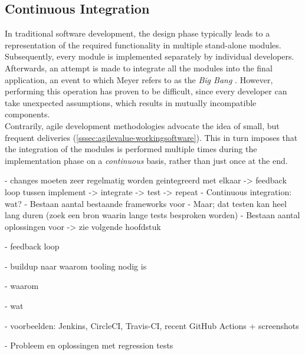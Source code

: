 
\subsection{Continuous Integration}
In traditional software development, the design phase typically leads to a representation of the required functionality in multiple stand-alone modules. Subsequently, every module is implemented separately by individual developers. Afterwards, an attempt is made to integrate all the modules into the final application, an event to which Meyer refers to as the \emph{Big Bang} \cite[~p.103]{Meyer2014}. However, performing this operation has proven to be difficult, since every developer can take unexpected assumptions, which results in mutually incompatible components.\\

\noindent Contrarily, agile development methodologies advocate the idea of small, but frequent deliveries (\autoref{sssec:agilevalue-workingsoftware}). This in turn imposes that the integration of the modules is performed multiple times during the implementation phase on a \emph{continuous} basis, rather than just once at the end. 




- changes moeten zeer regelmatig worden geintegreerd met elkaar -> feedback loop tussen implement -> integrate -> test -> repeat
- Continuous integration: wat?
- Bestaan aantal bestaande frameworks voor
- Maar; dat testen kan heel lang duren (zoek een bron waarin lange tests besproken worden)
- Bestaan aantal oplossingen voor -> zie volgende hoofdstuk

- feedback loop

- buildup naar waarom tooling nodig is

- waarom

- wat

- voorbeelden: Jenkins, CircleCI, Travis-CI, recent GitHub Actions + screenshots

- Probleem en oplossingen met regression tests

